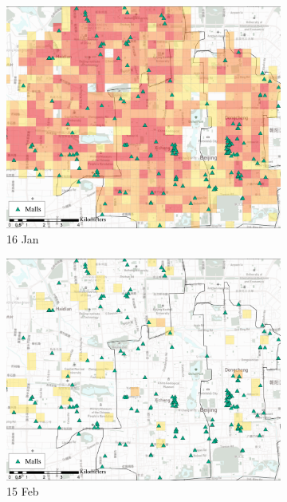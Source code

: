 \documentclass[preprints,article,accept,moreauthors,pdftex]{Definitions/mdpi}
\begin{document}
\begin{figure}[H]
    \centering
    \begin{subfigure}{.32\textwidth}
        \includegraphics[width=\textwidth]{Figures/Relation_with_POIs/POIsMallD2020_01_16.pdf}
        \caption{16 Jan}
    \end{subfigure}
    \begin{subfigure}{.32\textwidth}
        \includegraphics[width=\textwidth]{Figures/Relation_with_POIs/POIsMallD2020_02_15.pdf}
        \caption{15 Feb}
    \end{subfigure}
    \begin{subfigure}{.32\textwidth}

\end{subfigure}
\end{figure}
\end{document}
